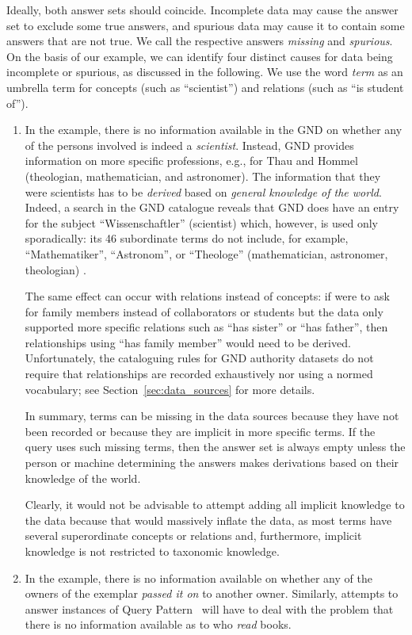 Ideally, both answer sets should coincide.
Incomplete data may cause the answer set to exclude some true answers,
and spurious data may cause it to contain some answers that are not true.
We call the respective answers \emph{missing} and \emph{spurious}.
On the basis of our example, we can identify four distinct causes for data being incomplete or spurious,
as discussed in the following. We use the word \emph{term} as an umbrella term for concepts (such as \enquote{scientist})
and relations (such as \enquote{is student of}).
%
\begin{enumerate}
  \item
    In the example, there is no information available in the \gls{GND} on whether any of the persons involved is indeed
    a \emph{scientist}. Instead, \gls{GND} provides information on more specific professions,
    e.g., for Thau and Hommel (theologian, mathematician, and astronomer).
    The information that they were scientists has to be \emph{derived} based on \emph{general knowledge
    of the world}.
    Indeed, a search in the \gls{GND} catalogue
    reveals that \gls{GND} does have an entry for the subject \enquote{Wissenschaftler} (scientist) \autocite{GNDScientist}
    which, however, is used only sporadically: its 46 subordinate terms do not include, for example,
    \enquote{Mathematiker}, \enquote{Astronom}, or \enquote{Theologe} (mathematician, astronomer, theologian)  \autocite{GNDScientistSub}.
    
    The same effect can occur with relations instead of concepts:
    if  were to ask for family members instead of collaborators or students
    but the data only supported more specific relations
    such as \enquote{has sister} or \enquote{has father}, then relationships using
    \enquote{has family member} would need to be derived.
    Unfortunately, the cataloguing rules for \gls{GND} authority datasets do not require
    that relationships are recorded exhaustively nor using a normed vocabulary;
    see Section~\ref{sec:data_sources} for more details.
    
    In summary, terms can be missing in the data sources because
    they have not been recorded or because they are implicit in more specific terms.
    If the query uses such missing terms, then the answer set is always empty
    unless the person or machine determining the answers makes derivations based on their
    knowledge of the world.

    Clearly, it would not be advisable to attempt adding all implicit knowledge to the data
    because that would massively inflate the data,
    as most terms have several superordinate concepts or relations and,
    furthermore, implicit knowledge is not restricted to taxonomic knowledge.
  \item
    In the example, there is no information available on whether any of the owners of the exemplar
    \emph{passed it on} to another owner. Similarly,
    attempts to answer instances of Query Pattern~ will have to deal
    with the problem that there is no information available as to who \emph{read} books.
    

\end{enumerate}
